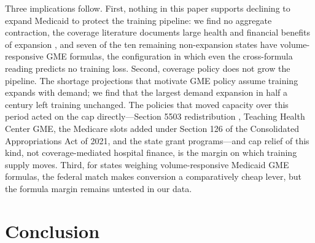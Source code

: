 Three implications follow. First, nothing in this paper supports declining to expand Medicaid to protect the training pipeline: we find no aggregate contraction, the coverage literature documents large health and financial benefits of expansion \autocite{sommers2017, miller2021}, and seven of the ten remaining non-expansion states have volume-responsive GME formulas, the configuration in which even the cross-formula reading predicts no training loss. Second, coverage policy does not grow the pipeline. The shortage projections that motivate GME policy assume training expands with demand; we find that the largest demand expansion in half a century left training unchanged. The policies that moved capacity over this period acted on the cap directly---Section 5503 redistribution \autocite{mcnamara2025b}, Teaching Health Center GME, the Medicare slots added under Section 126 of the Consolidated Appropriations Act of 2021, and the state grant programs---and cap relief of this kind, not coverage-mediated hospital finance, is the margin on which training supply moves. Third, for states weighing volume-responsive Medicaid GME formulas, the federal match makes conversion a comparatively cheap lever, but the formula margin remains untested in our data.

\section{Conclusion}\label{sec:conc}

